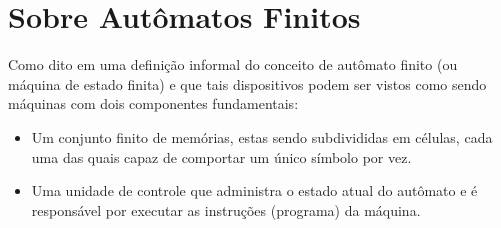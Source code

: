 \section{Sobre Autômatos Finitos}\label{sec:Automata}

Como dito em \cite{valdi2016master, valdi2020phd} uma definição informal do conceito de autômato finito (ou máquina de estado finita) e que tais dispositivos podem ser vistos como sendo máquinas com dois componentes fundamentais:

\begin{itemize}
	\item Um conjunto finito de memórias, estas sendo subdivididas em células, cada uma das quais capaz de comportar um único símbolo por vez.
	\item Uma unidade de controle que  administra o estado atual do autômato e é responsável por executar as instruções (programa) da máquina.
\end{itemize}

